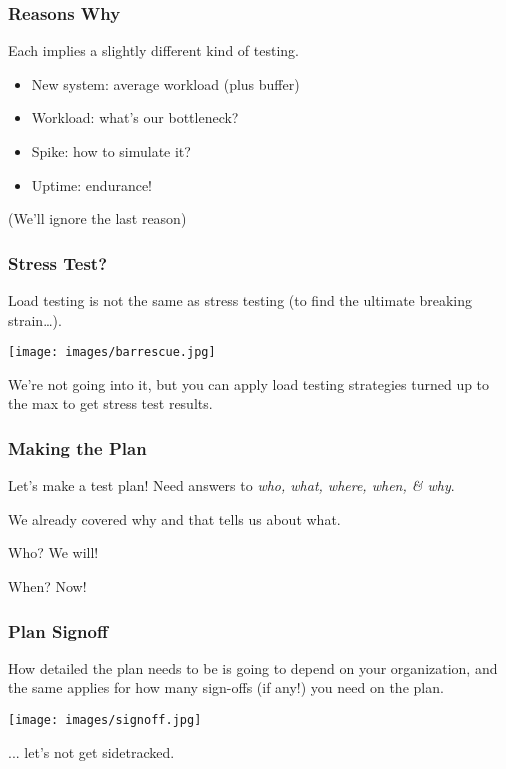 \begin{frame}
\frametitle{Reasons Why}

Each implies a slightly different kind of testing.

\begin{itemize}
	\item New system: average workload (plus buffer)
	\item Workload: what's our bottleneck?
	\item Spike: how to simulate it?
	\item Uptime: endurance!
\end{itemize}

(We'll ignore the last reason)

\end{frame}

\begin{frame}
\frametitle{Stress Test?}

Load testing is not the same as \alert{stress testing} (to find the ultimate breaking strain\ldots).

\begin{center}
  \texttt{[image: images/barrescue.jpg]}
\end{center}

We're not going into it, but you can apply load testing strategies turned up to the max to get stress test results.

\end{frame}

\begin{frame}
\frametitle{Making the Plan}

Let's make a test plan! Need answers to \textit{who, what, where, when, \& why}.

We already covered why and that tells us about what.

Who? We will!

When? Now!

\end{frame}

\begin{frame}
\frametitle{Plan Signoff}

How detailed the plan needs to be is going to depend on your organization, and the same applies for how many sign-offs (if any!) you need on the plan. 

\begin{center}
  \texttt{[image: images/signoff.jpg]}
\end{center}

... let's not get sidetracked.

\end{frame}



